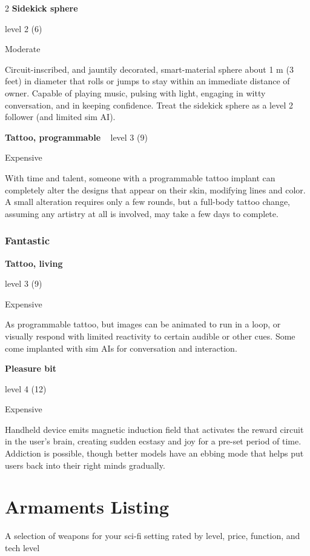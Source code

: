 \begin{multicols}{2}
\textbf{Sidekick sphere} 

level 2 (6) 

Moderate 

Circuit-inscribed, and jauntily decorated, smart-material sphere about 1 m (3 feet) in diameter that rolls or jumps to stay within an immediate distance of owner. Capable of playing music, pulsing with light, engaging in witty conversation, and in keeping confidence. Treat the sidekick sphere as a level 2 follower (and limited sim AI). 

\textbf{Tattoo, programmable}
 
level 3 (9) 

Expensive 

With time and talent, someone with a programmable tattoo implant can completely alter the designs that appear on their skin, modifying lines and color. A small alteration requires only a few rounds, but a full-body tattoo change, assuming any artistry at all is involved, may take a few days to complete. 

\subsubsection{Fantastic}

\textbf{Tattoo, living} 

level 3 (9) 

Expensive 

As programmable tattoo, but images can be animated to run in a loop, or visually respond with limited reactivity to certain audible or other cues. Some come implanted with sim AIs for conversation and interaction.

\textbf{Pleasure bit} 

level 4 (12) 

Expensive 

Handheld device emits magnetic induction field that activates the reward circuit in the user’s brain, creating sudden ecstasy and joy for a pre-set period of time. Addiction is possible, though better models have an ebbing mode that helps put users back into their right minds gradually.

\section{Armaments Listing}

A selection of weapons for your sci-fi setting rated by level, price, function, and tech level


\end{multicols}
